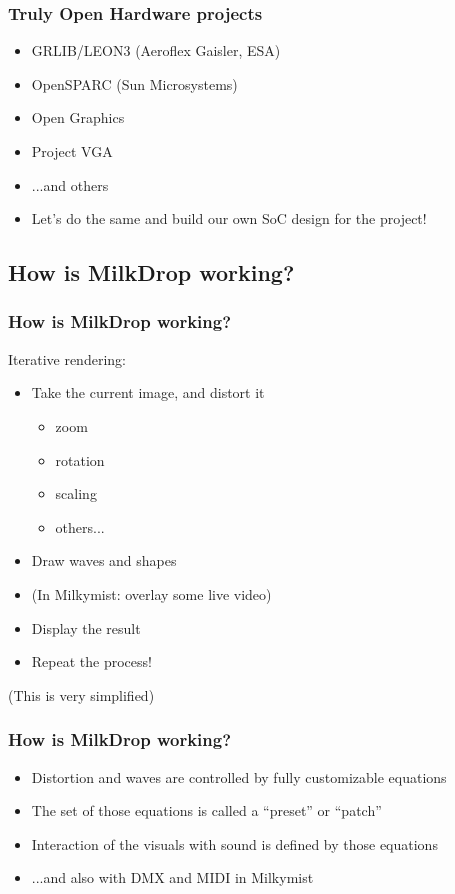 \documentclass{beamer}
\begin{document}
\frame
{
  \frametitle{Truly Open Hardware projects}

  \begin{itemize}
  \item GRLIB/LEON3 (Aeroflex Gaisler, ESA)
  \item OpenSPARC (Sun Microsystems)
  \item Open Graphics
  \item Project VGA
  \item ...and others
  \item Let's do the same and build our own SoC design for the project!
  \end{itemize}
}

\subsection{How is MilkDrop working?}
\frame
{
  \frametitle{How is MilkDrop working?}

Iterative rendering:
  \begin{itemize}
  \item Take the current image, and distort it
  \begin{itemize}
    \item zoom
    \item rotation
    \item scaling
    \item others...
  \end{itemize}
  \item Draw waves and shapes
  \item (In Milkymist: overlay some live video)
  \item Display the result
  \item Repeat the process!
  \end{itemize}
  (This is very simplified)
}

\frame
{
  \frametitle{How is MilkDrop working?}

  \begin{itemize}
  \item Distortion and waves are controlled by fully customizable equations
  \item The set of those equations is called a ``preset'' or ``patch''
  \item Interaction of the visuals with sound is defined by those equations
  \item ...and also with DMX and MIDI in Milkymist
  \end{itemize}
}
\end{document}
